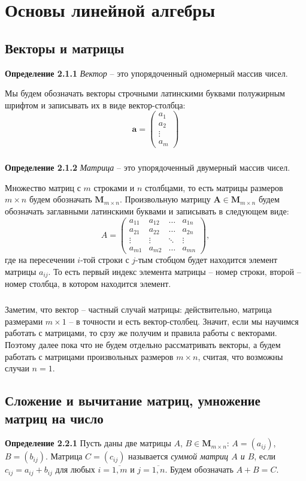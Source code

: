 \documentclass[12pt,a4paper]{article}
\begin{document}
\newpage
\section{Основы линейной алгебры}
\subsection{Векторы и матрицы}
\textbf{Определение 2.1.1} 
\textit{Вектор} -- это упорядоченный одномерный массив чисел. 

Мы будем обозначать векторы строчными латинскими буквами полужирным шрифтом и записывать их в виде вектор-столбца:
\[
\textbf{a} = \begin{pmatrix}
a_1 \\
a_2 \\
\vdots \\
a_m
\end{pmatrix}
\]

\subparagraph{}
\textbf{Определение 2.1.2} 
\textit{Матрица} -- это упорядоченный двумерный массив чисел. 

Множество матриц с $m$ строками и $n$ столбцами, то есть матрицы размеров $m \times n$ будем обозначать $\textbf{M}_{m \times n}$. Произвольную матрицу $\textbf{A} \in \textbf{M}_{m \times n}$
будем обозначать заглавными латинскими буквами и записывать в следующем виде: 
\[
A = \begin{pmatrix}
a_{11}& a_{12} &\ldots & a_{1n}\\
a_{21}& a_{22} &\ldots & a_{2n}\\
\vdots& \vdots &\ddots & \vdots\\
a_{m1}& a_{m2} &\ldots & a_{mn}
\end{pmatrix},
\]
где на пересечении $i$-той строки с $j$-тым стобцом будет находится элемент матрицы $a_{ij}$. То есть 
первый индекс элемента матрицы -- номер строки, второй -- номер столбца, в котором находится элемент.
\subparagraph{}
Заметим, что вектор -- частный случай матрицы: действительно, матрица размерами $m \times 1$ -- 
в точности и есть вектор-столбец. Значит, если мы научимся работать с матрицами, то срзу же получим и правила работы с векторами. Поэтому далее пока что не будем отдельно рассматривать векторы, а будем работать с матрицами произвольных размеров $m \times n$, считая, что возможны случаи $n = 1$. 

\subsection{Сложение и вычитание матриц, умножение матриц на число}
\textbf{Определение 2.2.1} 
Пусть даны две матрицы $A$, $B \in \textbf{M}_{m \times n}$: $A = (a_{ij})$, $B = (b_{ij})$. Матрица $C = (c_{ij})$ называется \textit{суммой матриц $A$ и $B$}, если $c_{ij} = a_{ij} + b_{ij}$ для любых
$i = \overline{1, m}$ и $j = \overline{1, n}$. Будем обозначать $A + B = C$.
\end{document}
